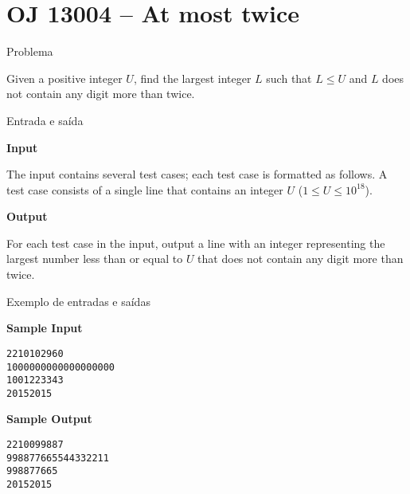 \section{OJ 13004 -- At most twice}

\begin{frame}[fragile]{Problema}

Given a positive integer $U$, find the largest integer $L$ such that $L\leq U$ and $L$ does not 
contain any digit more than twice.

\end{frame}

\begin{frame}[fragile]{Entrada e saída}

\textbf{Input}

The input contains several test cases; each test case is formatted as follows. A test case 
consists of a single line that contains an integer $U$ ($1\leq U\leq 10^{18}$).

\textbf{Output}

For each test case in the input, output a line with an integer representing the largest number 
less than or equal to $U$ that does not contain any digit more than twice.

\end{frame}

\begin{frame}[fragile]{Exemplo de entradas e saídas}

\begin{minipage}[t]{0.45\textwidth}
\textbf{Sample Input}
\begin{verbatim}
2210102960
1000000000000000000
1001223343
20152015
\end{verbatim}
\end{minipage}
\begin{minipage}[t]{0.5\textwidth}
\textbf{Sample Output}
\begin{verbatim}
2210099887
998877665544332211
998877665
20152015
\end{verbatim}
\end{minipage}
\end{frame}

